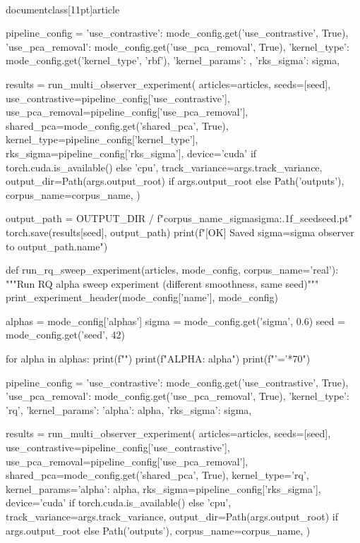 \\documentclass[11pt]{article}
\begin{document}
\begin{CodeBlock}
        pipeline_config = {
            'use_contrastive': mode_config.get('use_contrastive', True),
            'use_pca_removal': mode_config.get('use_pca_removal', True),
            'kernel_type': mode_config.get('kernel_type', 'rbf'),
            'kernel_params': {},
            'rks_sigma': sigma,
        }
        
        results = run_multi_observer_experiment(
            articles=articles,
            seeds=[seed],
            use_contrastive=pipeline_config['use_contrastive'],
            use_pca_removal=pipeline_config['use_pca_removal'],
            shared_pca=mode_config.get('shared_pca', True),
            kernel_type=pipeline_config['kernel_type'],
            rks_sigma=pipeline_config['rks_sigma'],
            device='cuda' if torch.cuda.is_available() else 'cpu',
            track_variance=args.track_variance,
            output_dir=Path(args.output_root) if args.output_root else Path('outputs'),
            corpus_name=corpus_name,
        )
        
        output_path = OUTPUT_DIR / f"{corpus_name}_sigma{sigma:.1f}_seed{seed}.pt"
        torch.save(results[seed], output_path)
        print(f"[OK] Saved sigma={sigma} observer to {output_path.name}")


def run_rq_sweep_experiment(articles, mode_config, corpus_name='real'):
    """Run RQ alpha sweep experiment (different smoothness, same seed)"""
    print_experiment_header(mode_config['name'], mode_config)
    
    alphas = mode_config['alphas']
    sigma = mode_config.get('sigma', 0.6)
    seed = mode_config.get('seed', 42)
    
    for alpha in alphas:
        print(f"")
        print(f"ALPHA: {alpha}")
        print(f"{'='*70}")
        
        pipeline_config = {
            'use_contrastive': mode_config.get('use_contrastive', True),
            'use_pca_removal': mode_config.get('use_pca_removal', True),
            'kernel_type': 'rq',
            'kernel_params': {'alpha': alpha},
            'rks_sigma': sigma,
        }
        
        results = run_multi_observer_experiment(
            articles=articles,
            seeds=[seed],
            use_contrastive=pipeline_config['use_contrastive'],
            use_pca_removal=pipeline_config['use_pca_removal'],
            shared_pca=mode_config.get('shared_pca', True),
            kernel_type='rq',
            kernel_params={'alpha': alpha},
            rks_sigma=pipeline_config['rks_sigma'],
            device='cuda' if torch.cuda.is_available() else 'cpu',
            track_variance=args.track_variance,
            output_dir=Path(args.output_root) if args.output_root else Path('outputs'),
            corpus_name=corpus_name,
        )
        

\end{CodeBlock}
\end{document}
